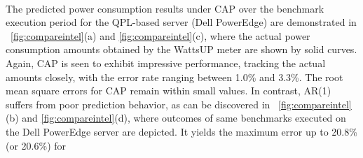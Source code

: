 \begin{figure*}[tp]
  \centering
  \\
  \caption{Actual power results versus predicted results for an Intel
    Nehalem server.}
  \label{fig:compareintel}
\end{figure*}
The predicted power consumption results under CAP over the benchmark
execution period for the QPL-based server (Dell PowerEdge) are
demonstrated in \figurenames~\ref{fig:compareintel}(a) and
\ref{fig:compareintel}(c), where the actual power consumption amounts
obtained by the WattsUP meter are shown by solid curves.  Again, CAP is
seen to exhibit impressive performance, tracking the actual amounts
closely, with the error rate ranging between 1.0\% and 3.3\%.  The root
mean square errors for CAP remain within small values.  In contrast,
AR(1) suffers from poor prediction behavior, as can be discovered in
\figurenames~\ref{fig:compareintel}(b) and \ref{fig:compareintel}(d),
where outcomes of same benchmarks executed on the Dell PowerEdge server
are depicted.  It yields the maximum error up to 20.8\% (or 20.6\%) for
